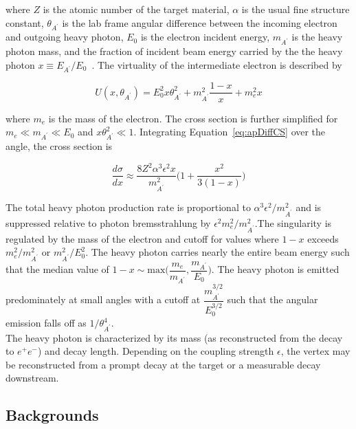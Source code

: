 where $Z$ is the atomic number of the target material, $\alpha$ is the usual fine structure constant, $\theta_{A^{\prime}}$ is the lab frame angular difference between the incoming electron and outgoing heavy photon, $E_0$ is the electron incident energy, $m_{A^{\prime}}$ is the heavy photon mass, and the fraction of incident beam energy carried by the the heavy photon $x\equiv E_{A^{\prime}}/E_0$~\cite{bjorken_new_2009}. The virtuality of the intermediate electron is described by

\begin{equation}
	\label{eq:virtuality}
	U(x,\theta_{A^{\prime}}) = E_0^2x\theta_{A^{\prime}}^2+m_{A^{\prime}}^2\dfrac{1-x}{x}+m_e^2x 
\end{equation}

where $m_e$ is the mass of the electron. The cross section is further simplified for $m_e\ll m_{A^{\prime}}\ll E_0$ and $x\theta_{A^{\prime}}^2\ll 1$. Integrating Equation~\eqref{eq:apDiffCS} over the angle, the cross section is

\begin{equation}
	\label{eq:csFinal}
	\dfrac{d\sigma}{dx} \approx \dfrac{8Z^2\alpha^3\epsilon^2x}{m_{A^{\prime}}^2}\Big(1+\dfrac{x^2}{3(1-x)}\Big)
\end{equation}

The total heavy photon production rate is proportional to $\alpha^3\epsilon^2/m_{A^{\prime}}^2$ and is suppressed relative to photon bremsstrahlung by $\epsilon^2m_e^2/m_{A^{\prime}}^2$.The singularity is regulated by the mass of the electron and cutoff for values where $1-x$ exceeds $m_e^2/m_{A^{\prime}}^2$ or $m_{A^{\prime}}^2/E_0^2$. The heavy photon carries nearly the entire beam energy such that the median value of $1-x\sim\textrm{max}\Big(\dfrac{m_e}{m_{A^{\prime}}}, \dfrac{m_{A^{\prime}}}{E_0}\Big)$. The heavy photon is emitted predominately at small angles with a cutoff at $\dfrac{m_{A^{\prime}}^{3/2}}{E_0^{3/2}}$ such that the angular emission falls off as $1/\theta_{A^{\prime}}^4$.\\
 \indent The heavy photon is characterized by its mass (as reconstructed from the decay to $e^+e^-$) and decay length. Depending on the coupling strength $\epsilon$, the vertex may be reconstructed from a prompt decay at the target or a measurable decay downstream.  

\subsection{Backgrounds}

